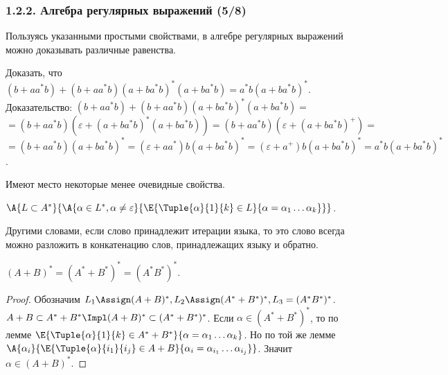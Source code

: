 \begin{frame}
\frametitle{1.2.2. Алгебра регулярных выражений (5/8)}

Пользуясь указанными простыми свойствами, в алгебре регулярных выражений
можно доказывать различные равенства.

\begin{example}
 Доказать, что
$(b+aa^*b)+(b+aa^*b)(a+ba^*b)^*(a+ba^*b) = a^*b(a+ba^*b)^*$.
Доказательство:
$(b+aa^*b)+(b+aa^*b)(a+ba^*b)^*(a+ba^*b) =$\\
$=(b+aa^*b)(\varepsilon+(a+ba^*b)^*(a+ba^*b)) =
(b+aa^*b)(\varepsilon+(a+ba^*b)^+) = $\\
$=(b+aa^*b)(a+ba^*b)^* = 
(\varepsilon+aa^*)b(a+ba^*b)^* = (\varepsilon+a^+)b(a+ba^*b)^* = a^*b(a+ba^*b)^*$.
\end{example}

Имеют место некоторые менее очевидные свойства.

\begin{lemma}
$\A{L\subset A^*}
   {\A{\alpha\in L^*, \alpha\neq\varepsilon}
      {\E{\Tuple{\alpha}{1}{k}\in L}
         {\alpha=\alpha_1\dots\alpha_k}
      }
   }$.
\end{lemma}
Другими словами, если слово принадлежит итерации языка, то это слово всегда можно
разложить в конкатенацию слов, принадлежащих языку и обратно.  

\begin{theorem}
$(A+B)^*=(A^*+B^*)^* =(A^*B^*)^*$.
\end{theorem}
\begin{proof}
Обозначим $L_1\Assign (A+B)^*, L_2\Assign 
(A^*+B^*)^*, L_3=(A^*B^*)^*$.
$A+B\subset A^* + B^* \Impl (A+B)^*\subset 
(A^* + B^*)^*$.
Если $\alpha\in (A^*+B^*)^*$, то по лемме 
$\E{\Tuple{\alpha}{1}{k}\in A^*+B^*}{\alpha=
\alpha_1\dots\alpha_k}$.
Но по той же лемме
$\A{\alpha_i}{\E{\Tuple{\alpha}{i_1}{i_j}\in A+
B}{\alpha_i=\alpha_{i_1}\dots\alpha_{i_j}}}$.
Значит $\alpha\in (A+B)^*$.
\end{proof}
\end{frame}

